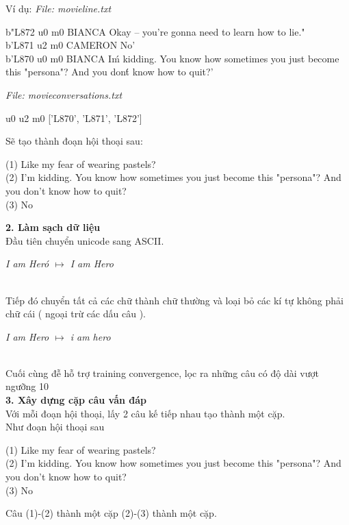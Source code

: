 Ví dụ:
\textit{File: movie\detokenize{_}line.txt}
\begin{displayquote}
b"L872 \detokenize{+++$+++}  u0 \detokenize{+++$+++}  m0 \detokenize{+++$+++}  BIANCA \detokenize{+++$+++}  Okay -- you're gonna need to learn how to lie.\n" \\
b'L871 \detokenize{+++$+++}  u2 \detokenize{+++$+++}  m0 \detokenize{+++$+++}  CAMERON \detokenize{+++$+++}  No\n' \\
b'L870 \detokenize{+++$+++}  u0 \detokenize{+++$+++}  m0 \detokenize{+++$+++}  BIANCA \detokenize{+++$+++}  I\'m kidding.  You know how sometimes you just become this
"persona"?  And you don\'t know how to quit?\n' \\
\end{displayquote}
\textit{File: movie\detokenize{_}conversations.txt}
\begin{displayquote}
    u0 \detokenize{+++$+++} u2 \detokenize{+++$+++} m0 \detokenize{+++$+++} ['L870', 'L871', 'L872']
\end{displayquote}

Sẽ tạo thành đoạn hội thoại sau:
\begin{displayquote}
    (1) Like my fear of wearing pastels? \\
    (2) I'm kidding.  You know how sometimes you just become this "persona"?  And you don't know how to quit? \\
    (3) No \\
\end{displayquote}

\textbf{2. Làm sạch dữ liệu} \\
Đầu tiên chuyển unicode sang ASCII.\\
    \centerline{\textit{I am Heró \(\mapsto\) I am Hero}} \\
Tiếp đó chuyển tất cả các chữ thành chữ thường và loại bỏ các kí tự không phải chữ cái ( ngoại trừ các dấu câu ). \\
    \centerline{\textit{I am Hero  \(\mapsto\) i am hero}} \\
Cuối cùng đễ hỗ trợ training convergence, lọc ra những câu có độ dài vượt ngưỡng 10 \\

\textbf{3. Xây dựng cặp câu vấn đáp} \\
Với mỗi đoạn hội thoại, lấy 2 câu kế tiếp nhau tạo thành một cặp.\\
Như đoạn hội thoại sau
\begin{displayquote}
    (1) Like my fear of wearing pastels? \\
    (2) I'm kidding.  You know how sometimes you just become this "persona"?  And you don't know how to quit? \\
    (3) No \\
\end{displayquote}
Câu (1)-(2) thành một cặp (2)-(3) thành một cặp.

